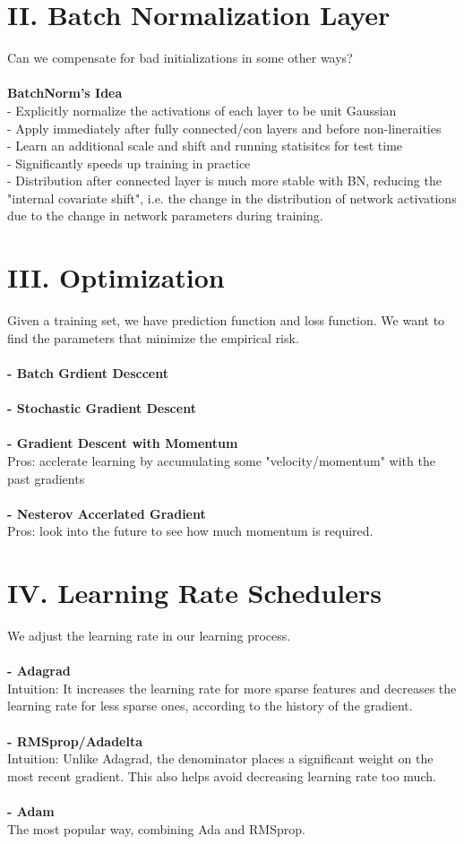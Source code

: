 \documentclass{article}
\begin{document}
\section*{II. Batch Normalization Layer}
Can we compensate for bad initializations in some other ways? \\
\\
\textbf{BatchNorm's Idea} \\
- Explicitly normalize the activations of each layer to be unit Gaussian \\
- Apply immediately after fully connected/con layers and before non-lineraities \\
- Learn an additional scale and shift and running statisitcs for test time \\
- Significantly speeds up training in practice \\
- Distribution after connected layer is much more stable with BN, reducing the "internal covariate shift", i.e. the change in the distribution of network activations due to the change in network parameters during training. 

\section*{III. Optimization}
Given a training set, we have prediction function and loss function. We want to find the parameters that minimize the empirical risk. \\
\\
\textbf{- Batch Grdient Desccent} \\
\\
\textbf{- Stochastic Gradient Descent} \\
\\
\textbf{- Gradient Descent with Momentum} \\
Pros: acclerate learning by accumulating some "velocity/momentum" with the past gradients \\
\\
\textbf{- Nesterov Accerlated Gradient} \\
Pros: look into the future to see how much momentum is required. 

\section*{IV. Learning Rate Schedulers}
We adjust the learning rate in our learning process. \\
\\
\textbf{- Adagrad} \\
Intuition: It increases the learning rate for more sparse features and decreases the learning rate for less sparse ones, according to the history of the gradient. \\
\\
\textbf{- RMSprop/Adadelta} \\
Intuition: Unlike Adagrad, the denominator places a significant weight on the most recent gradient. This also helps avoid decreasing learning rate too much. \\
\\
\textbf{- Adam} \\
The most popular way, combining Ada and RMSprop.
\end{document}
